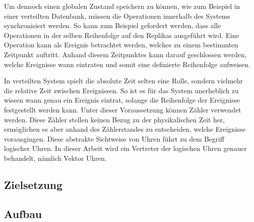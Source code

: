 Um dennoch einen globalen Zustand speichern zu können, wie zum Beispiel in einer verteilten Datenbank, müssen die Operationen innerhalb des Systems synchronisiert werden. So kann zum Beispiel gefordert werden, dass alle Operationen in der selben Reihenfolge auf den Replikas ausgeführt wird. Eine Operation kann als Ereignis betrachtet werden, welches zu einem bestimmten Zeitpunkt auftritt. Anhand diesem Zeitpunktes kann darauf geschlossen werden, welche Ereignisse wann eintraten und somit eine definierte Reihenfolge aufweisen.

In verteilten System spielt die absolute Zeit selten eine Rolle, sondern vielmehr die relative Zeit zwischen Ereignissen.
So ist es für das System unerheblich zu wissen wann genau ein Ereignis eintrat, solange die Reihenfolge der Ereignisse festgestellt werden kann. Unter dieser Voraussetzung können Zähler verwendet werden. Diese Zähler stellen keinen Bezug zu der physikalischen Zeit her, ermöglichen es aber anhand des Zählerstandes zu entscheiden, welche Ereignisse vorausgingen.
Diese abstrakte Sichtweise von Uhren führt zu dem Begriff logischer Uhren. In dieser Arbeit wird ein Vertreter der logischen Uhren genauer behandelt, nämlich Vektor Uhren.

\subsection{Zielsetzung}
\subsection{Aufbau}

    
  
